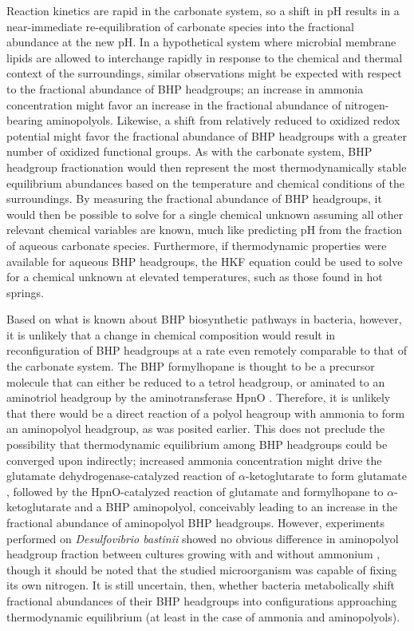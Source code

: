 Reaction kinetics are rapid in the carbonate system, so a shift in pH results in a near-immediate re-equilibration of carbonate species into the fractional abundance at the new pH. In a hypothetical system where microbial membrane lipids are allowed to interchange rapidly in response to the chemical and thermal context of the surroundings, similar observations might be expected with respect to the fractional abundance of BHP headgroups; an increase in ammonia concentration might favor an increase in the fractional abundance of nitrogen-bearing aminopolyols. Likewise, a shift from relatively reduced to oxidized redox potential might favor the fractional abundance of BHP headgroups with a greater number of oxidized functional groups. As with the carbonate system, BHP headgroup fractionation would then represent the most thermodynamically stable equilibrium abundances based on the temperature and chemical conditions of the surroundings. By measuring the fractional abundance of BHP headgroups, it would then be possible to solve for a single chemical unknown assuming all other relevant chemical variables are known, much like predicting pH from the fraction of aqueous carbonate species. Furthermore, if thermodynamic properties were available for aqueous BHP headgroups, the HKF equation could be used to solve for a chemical unknown at elevated temperatures, such as those found in hot springs.

Based on what is known about BHP biosynthetic pathways in bacteria, however, it is unlikely that a change in chemical composition would result in reconfiguration of BHP headgroups at a rate even remotely comparable to that of the carbonate system. The BHP formylhopane is thought to be a precursor molecule that can either be reduced to a tetrol headgroup, or aminated to an aminotriol headgroup by the aminotransferase HpnO \citep{welander2012identification}. Therefore, it is unlikely that there would be a direct reaction of a polyol heagroup with ammonia to form an aminopolyol headgroup, as was posited earlier. This does not preclude the possibility that thermodynamic equilibrium among BHP headgroups could be converged upon indirectly; increased ammonia concentration might drive the glutamate dehydrogenase-catalyzed reaction of $\alpha$-ketoglutarate to form glutamate \citep{lightfoot1988expression}, followed by the HpnO-catalyzed reaction of glutamate and formylhopane to $\alpha$-ketoglutarate and a BHP aminopolyol, conceivably leading to an increase in the fractional abundance of aminopolyol BHP headgroups.  However, experiments performed on \textit{Desulfovibrio bastinii} showed no obvious difference in aminopolyol headgroup fraction between cultures growing with and without ammonium \citep{blumenberg2012novel}, though it should be noted that the studied microorganism was capable of fixing its own nitrogen. It is still uncertain, then, whether bacteria metabolically shift fractional abundances of their BHP headgroups into configurations approaching thermodynamic equilibrium (at least in the case of ammonia and aminopolyols).

